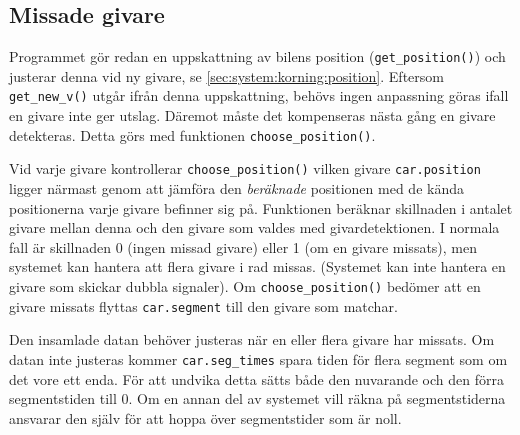 \subsection{Missade givare}
\label{sec:missade givare}

Programmet gör redan en uppskattning av bilens position (\texttt{get\_position()})
 och justerar denna vid ny givare, se \ref{sec:system:korning:position}.
Eftersom \texttt{get\_new\_v()} utgår ifrån denna uppskattning, behövs ingen
anpassning göras ifall en givare inte ger utslag. Däremot måste det 
kompenseras nästa gång en givare detekteras. Detta görs med funktionen
\texttt{choose\_position()}.

Vid varje givare kontrollerar \texttt{choose\_position()} vilken givare
\texttt{car.position} ligger närmast genom att jämföra den \emph{beräknade} positionen med de kända positionerna varje givare befinner sig på.
Funktionen beräknar skillnaden i antalet givare mellan denna och den givare som
valdes med givardetektionen. I normala fall är skillnaden 0 (ingen missad givare) eller 1 (om en
givare missats), men systemet kan hantera att flera givare i rad missas.
(Systemet kan inte hantera en givare som skickar dubbla signaler). Om
\texttt{choose\_position()} bedömer att en givare missats flyttas
\texttt{car.segment} till den givare som matchar.

Den insamlade datan behöver justeras när en eller flera givare har missats. Om
datan inte justeras kommer \texttt{car.seg\_times} spara tiden för flera segment
som om det vore ett enda. För att undvika detta sätts både den nuvarande och den
förra segmentstiden till 0. Om en annan del av systemet vill räkna på
segmentstiderna ansvarar den själv för att hoppa över segmentstider som är noll.
